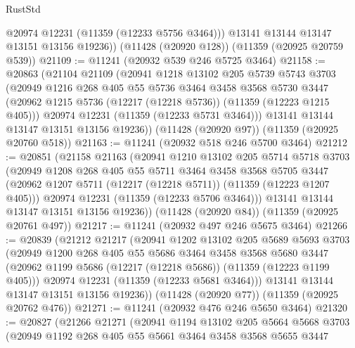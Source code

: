 \begin{lexlean}{RustStd}
\begin{coremodule}
{{{{{{{{{{{{{{{{{{{          @20974
          @12231
          (@11359 (@12233 @5756 @3464)))
        @13141
        @13144
        @13147
        @13151
        @13156
        @19236))
    (@11428 (@20920 @128))
    (@11359 (@20925 @20759 @539))
@21109 := @11241 (@20932 @539 @246 @5725 @3464)
@21158 := @20863
    (@21104
      @21109
      (@20941
        @1218
        @13102
        @205
        @5739
        @5743
        @3703
        (@20949
          @1216
          @268
          @405
          @55
          @5736
          @3464
          @3458
          @3568
          @5730
          @3447
          (@20962 @1215 @5736 (@12217 (@12218 @5736)) (@11359 (@12223 @1215 @405)))
          @20974
          @12231
          (@11359 (@12233 @5731 @3464)))
        @13141
        @13144
        @13147
        @13151
        @13156
        @19236))
    (@11428 (@20920 @97))
    (@11359 (@20925 @20760 @518))
@21163 := @11241 (@20932 @518 @246 @5700 @3464)
@21212 := @20851
    (@21158
      @21163
      (@20941
        @1210
        @13102
        @205
        @5714
        @5718
        @3703
        (@20949
          @1208
          @268
          @405
          @55
          @5711
          @3464
          @3458
          @3568
          @5705
          @3447
          (@20962 @1207 @5711 (@12217 (@12218 @5711)) (@11359 (@12223 @1207 @405)))
          @20974
          @12231
          (@11359 (@12233 @5706 @3464)))
        @13141
        @13144
        @13147
        @13151
        @13156
        @19236))
    (@11428 (@20920 @84))
    (@11359 (@20925 @20761 @497))
@21217 := @11241 (@20932 @497 @246 @5675 @3464)
@21266 := @20839
    (@21212
      @21217
      (@20941
        @1202
        @13102
        @205
        @5689
        @5693
        @3703
        (@20949
          @1200
          @268
          @405
          @55
          @5686
          @3464
          @3458
          @3568
          @5680
          @3447
          (@20962 @1199 @5686 (@12217 (@12218 @5686)) (@11359 (@12223 @1199 @405)))
          @20974
          @12231
          (@11359 (@12233 @5681 @3464)))
        @13141
        @13144
        @13147
        @13151
        @13156
        @19236))
    (@11428 (@20920 @77))
    (@11359 (@20925 @20762 @476))
@21271 := @11241 (@20932 @476 @246 @5650 @3464)
@21320 := @20827
    (@21266
      @21271
      (@20941
        @1194
        @13102
        @205
        @5664
        @5668
        @3703
        (@20949
          @1192
          @268
          @405
          @55
          @5661
          @3464
          @3458
          @3568
          @5655
          @3447
}}}}}}}}}}}}}}}}}}}
\end{coremodule}
\end{lexlean}
